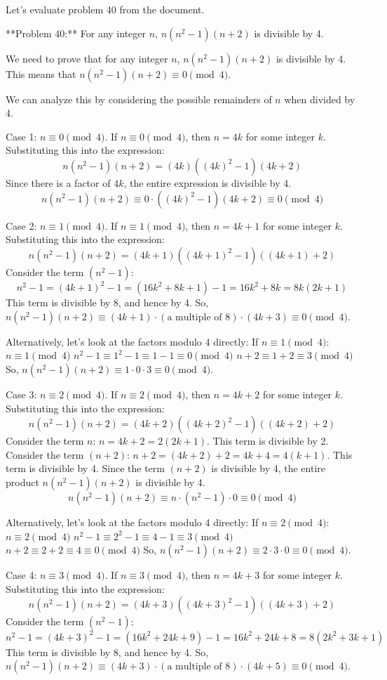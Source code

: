 \documentclass{article}
\begin{document}
Let's evaluate problem 40 from the document.

**Problem 40:** For any integer $n$, $n(n^2 - 1)(n + 2)$ is divisible by 4.

We need to prove that for any integer $n$, $n(n^2 - 1)(n + 2)$ is divisible by 4. This means that $n(n^2 - 1)(n + 2) \equiv 0 \pmod{4}$.

We can analyze this by considering the possible remainders of $n$ when divided by 4.

Case 1: $n \equiv 0 \pmod{4}$.
If $n \equiv 0 \pmod{4}$, then $n = 4k$ for some integer $k$.
Substituting this into the expression:
$$n(n^2 - 1)(n + 2) = (4k)((4k)^2 - 1)(4k + 2)$$
Since there is a factor of $4k$, the entire expression is divisible by 4.
$$n(n^2 - 1)(n + 2) \equiv 0 \cdot ((4k)^2 - 1)(4k + 2) \equiv 0 \pmod{4}$$

Case 2: $n \equiv 1 \pmod{4}$.
If $n \equiv 1 \pmod{4}$, then $n = 4k + 1$ for some integer $k$.
Substituting this into the expression:
$$n(n^2 - 1)(n + 2) = (4k+1)((4k+1)^2 - 1)((4k+1) + 2)$$
Consider the term $(n^2 - 1)$:
$$n^2 - 1 = (4k+1)^2 - 1 = (16k^2 + 8k + 1) - 1 = 16k^2 + 8k = 8k(2k + 1)$$
This term is divisible by 8, and hence by 4.
So, $n(n^2 - 1)(n + 2) \equiv (4k+1) \cdot (\text{a multiple of 8}) \cdot (4k+3) \equiv 0 \pmod{4}$.

Alternatively, let's look at the factors modulo 4 directly:
If $n \equiv 1 \pmod{4}$:
$n \equiv 1 \pmod{4}$
$n^2 - 1 \equiv 1^2 - 1 \equiv 1 - 1 \equiv 0 \pmod{4}$
$n + 2 \equiv 1 + 2 \equiv 3 \pmod{4}$
So, $n(n^2 - 1)(n + 2) \equiv 1 \cdot 0 \cdot 3 \equiv 0 \pmod{4}$.

Case 3: $n \equiv 2 \pmod{4}$.
If $n \equiv 2 \pmod{4}$, then $n = 4k + 2$ for some integer $k$.
Substituting this into the expression:
$$n(n^2 - 1)(n + 2) = (4k+2)((4k+2)^2 - 1)((4k+2) + 2)$$
Consider the term $n$:
$n = 4k+2 = 2(2k+1)$. This term is divisible by 2.
Consider the term $(n+2)$:
$n+2 = (4k+2) + 2 = 4k+4 = 4(k+1)$. This term is divisible by 4.
Since the term $(n+2)$ is divisible by 4, the entire product $n(n^2 - 1)(n + 2)$ is divisible by 4.
$$n(n^2 - 1)(n + 2) \equiv n \cdot (n^2 - 1) \cdot 0 \equiv 0 \pmod{4}$$

Alternatively, let's look at the factors modulo 4 directly:
If $n \equiv 2 \pmod{4}$:
$n \equiv 2 \pmod{4}$
$n^2 - 1 \equiv 2^2 - 1 \equiv 4 - 1 \equiv 3 \pmod{4}$
$n + 2 \equiv 2 + 2 \equiv 4 \equiv 0 \pmod{4}$
So, $n(n^2 - 1)(n + 2) \equiv 2 \cdot 3 \cdot 0 \equiv 0 \pmod{4}$.

Case 4: $n \equiv 3 \pmod{4}$.
If $n \equiv 3 \pmod{4}$, then $n = 4k + 3$ for some integer $k$.
Substituting this into the expression:
$$n(n^2 - 1)(n + 2) = (4k+3)((4k+3)^2 - 1)((4k+3) + 2)$$
Consider the term $(n^2 - 1)$:
$$n^2 - 1 = (4k+3)^2 - 1 = (16k^2 + 24k + 9) - 1 = 16k^2 + 24k + 8 = 8(2k^2 + 3k + 1)$$
This term is divisible by 8, and hence by 4.
So, $n(n^2 - 1)(n + 2) \equiv (4k+3) \cdot (\text{a multiple of 8}) \cdot (4k+5) \equiv 0 \pmod{4}$.
\end{document}
